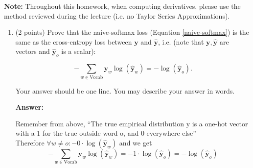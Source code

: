 \documentclass{article}
\newenvironment{answer}{
    {\bf Answer:} \sf \begingroup\color{red}
}{\endgroup}%
\begin{document}
\textbf{Note:} Throughout this homework, when computing derivatives, please use the method reviewed during the lecture (i.e. no Taylor Series Approximations).

\clearpage 
\begin{enumerate}[label=(\alph*)]
\item (2 points) 
Prove that the naive-softmax loss (Equation \ref{naive-softmax}) is the same as the cross-entropy loss between $\bm y$ and $\hat{\bm y}$, i.e. (note that $\bm y, \hat{\bm y}$ are vectors and $\hat{\bm y}_o$ is a scalar):

\begin{equation} 
-\sum_{w \in \text{Vocab}} \bm y_w \log(\hat{\bm y}_w) = - \log (\hat{\bm y}_o).
\end{equation}

Your answer should be one line. You may describe your answer in words.
\begin{shaded}
\begin{answer}
Remember from above, “The true empirical distribution y is a one-hot vector with a 1 for the true outside word o, and 0 everywhere else” \\
Therefore $\forall w \neq o : - 0 \cdot \log (\hat{\bm y}_w)$ and we get
\begin{equation}
-\sum_{w \in \text{Vocab}} \bm y_w \log(\hat{\bm y}_w) = - 1 \cdot \log (\hat{\bm y}_o) = - \log (\hat{\bm y}_o)
\end{equation}
\end{answer}
\end{shaded}


\end{enumerate}
\end{document}
